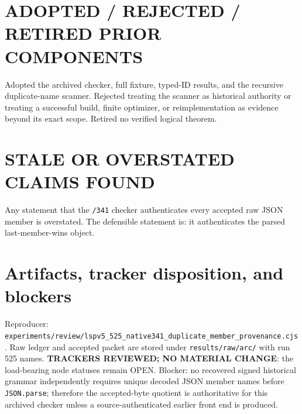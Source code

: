 \documentclass[11pt]{article}
\begin{document}
\section{ADOPTED / REJECTED / RETIRED PRIOR COMPONENTS}
Adopted the archived checker, full fixture, typed-ID results, and the recursive duplicate-name
scanner.  Rejected treating the scanner as historical authority or treating a successful build,
finite optimizer, or reimplementation as evidence beyond its exact scope.  Retired no verified
logical theorem.

\section{STALE OR OVERSTATED CLAIMS FOUND}
Any statement that the \texttt{/341} checker authenticates every accepted raw JSON member is
overstated.  The defensible statement is: it authenticates the parsed last-member-wins object.

\section{Artifacts, tracker disposition, and blockers}
Reproducer: \texttt{experiments/review/lspv5\_525\_native341\_duplicate\_member\_provenance.cjs}.
Raw ledger and accepted packet are stored under \texttt{results/raw/arc/} with run 525 names.
\textbf{TRACKERS REVIEWED; NO MATERIAL CHANGE}: the load-bearing node statuses remain OPEN.
Blocker: no recovered signed historical grammar independently requires unique decoded JSON member
names before \texttt{JSON.parse}; therefore the accepted-byte quotient is authoritative for this
archived checker unless a source-authenticated earlier front end is produced.

\end{document}
